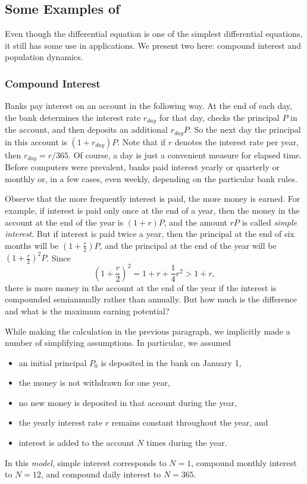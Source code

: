 \documentclass{ximera}
\begin{document}
\subsection*{Some Examples of \protect{}}

Even though the differential equation  is one of the
simplest differential equations, it still has some use in applications.
We present two here: compound interest and population dynamics.

\subsubsection*{Compound Interest} 

Banks pay interest on an account in the following way.  At the
end of each day, the bank determines the interest rate $r_{day}$ for
that day, checks the principal $P$ in the account, and then
deposits an additional $r_{day}P$.  So the next day the principal in
this account is $(1+r_{day})P$.  Note that if $r$ denotes the
interest rate per year, then $r_{day} = r/365$.  Of course, a day
is just a convenient measure for elapsed time.  Before computers
were prevalent, banks paid interest yearly or quarterly or monthly
or, in a few cases, even weekly, depending on the particular bank rules.

Observe that the more frequently interest is paid, the more
money is earned. For example, if interest is paid only once at
the end of a year, then the money in the account at the end of
the year is $(1+r)P$, and the amount $rP$ is called {\em simple
interest\/}.  But if interest is paid twice a year, then the principal
at the end of six months will be $(1+\frac{r}{2})P$, and the principal
at the end of the year will be $(1+\frac{r}{2})^2P$.  Since
\[
\left(1+\frac{r}{2}\right)^2 = 1+r+\frac{1}{4}r^2 > 1+r,
\]
there is more money in the account at the end of the
year if the interest is compounded semiannually rather than
annually.  But how much is the difference and what is the
maximum earning potential?

While making the calculation in the previous paragraph, we
implicitly made a number of simplifying assumptions.  In
particular, we assumed
\begin{itemize}
\item	an initial principal $P_0$ is deposited in the bank on January 1,
\item	the money is not withdrawn for one year,
\item	no new money is deposited in that account during the year,
\item	the yearly interest rate $r$ remains constant throughout
	the year, and
\item	interest is added to the account $N$ times during the year.
\end{itemize}
In this {\em model\/}, simple interest corresponds to $N=1$, compound monthly
interest to $N=12$, and compound daily interest to $N=365$.
\end{document}
